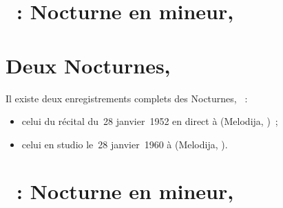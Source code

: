 \section{\ifChrono \Chopin{}~: \fi
Nocturne  en \kG mineur,  }
\label{\thesection}

\begin{workitemize}
 \item{}
 \begin{perfitemize}
  \item{}
  \item{}
 \end{perfitemize}
\end{workitemize}

\section*{%
Deux Nocturnes, }

Il existe deux enregistrements complets des Nocturnes, ~:
\begin{itemize}
 \item
 celui du récital du~28 janvier~1952 en direct à \LPGH (Melodija, )~;
 \item
 celui en studio le~28 janvier~1960 à \Moscow (Melodija, ).
\end{itemize}

\section{\ifChrono \Chopin{}~: \fi
Nocturne  en \kC \Sharp mineur,  }
\label{\thesection}

\begin{workitemize}
 \item{}
 \begin{perfitemize}
  \item{}
  \item{}
 \end{perfitemize}
 \item{}
 \begin{perfitemize}
  \item{}
  \item{}
 \end{perfitemize}
\end{workitemize}


